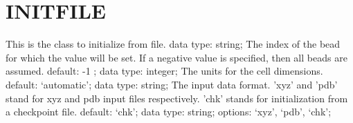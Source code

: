 \section{INITFILE}
\label{INITFILE}
\begin{ipifield}{}%
{This is the class to initialize from file.}%
{data type: string; }%
{%
{The index of the bead for which the value will be set. If a negative value is specified, then all beads are assumed.}%
{default:  -1 ; data type: integer; }%
%
{The units for the cell dimensions.}%
{default: `automatic'; data type: string; }%
%
{The input data format. 'xyz' and 'pdb' stand for xyz and pdb input files respectively. 'chk' stands for initialization from a checkpoint file.}%
{default: `chk'; data type: string; options: `xyz', `pdb', `chk'; }%
}
\end{ipifield}
